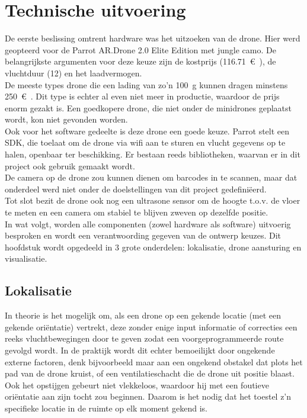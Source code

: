 \chapter{Technische uitvoering}
De eerste beslissing omtrent hardware was het uitzoeken van de drone.
Hier werd geopteerd voor de Parrot AR.Drone 2.0 Elite Edition met jungle camo.
De belangrijkste argumenten voor deze keuze zijn de kostprijs (\SI{116.71}{\euro{}}), de vluchtduur (\SI{12}{\min}) en het laadvermogen.\\
De meeste types drone die een lading van zo'n \SI{100}{\g} kunnen dragen minstens \SI{250}{\euro{}}.
Dit type is echter al even niet meer in productie, waardoor de prijs enorm gezakt is.
Een goedkopere drone, die niet onder de minidrones geplaatst wordt, kon niet gevonden worden.\\
Ook voor het software gedeelte is deze drone een goede keuze. Parrot stelt een SDK, die toelaat om de drone via wifi aan te sturen en vlucht gegevens op te halen, openbaar ter beschikking.
Er bestaan reeds bibliotheken, waarvan er in dit project ook gebruik gemaakt wordt.\\
De camera op de drone zou kunnen dienen om barcodes in te scannen, maar dat onderdeel werd niet onder de doelstellingen van dit project gedefini\"eerd.\\
Tot slot bezit de drone ook nog een ultrasone sensor om de hoogte t.o.v. de vloer te meten en een camera om stabiel te blijven zweven op dezelfde positie.\\

In wat volgt, worden alle componenten (zowel hardware als software) uitvoerig besproken en wordt een verantwoording gegeven van de ontwerp keuzes. Dit hoofdstuk wordt opgedeeld in 3 grote onderdelen: lokalisatie, drone aansturing en visualisatie.

\section{Lokalisatie}
In theorie is het mogelijk om, als een drone op een gekende locatie (met een gekende ori\"entatie) vertrekt, deze zonder enige input informatie of correcties een reeks vluchtbewegingen door te geven zodat een voorgeprogrammeerde route gevolgd wordt. In de praktijk wordt dit echter bemoeilijkt door ongekende externe factoren, denk bijvoorbeeld maar aan een ongekend obstakel dat plots het pad van de drone kruist, of een ventilatieschacht die de drone uit positie blaast. Ook het opstijgen gebeurt niet vlekkeloos, waardoor hij met een foutieve ori\"entatie aan zijn tocht zou beginnen. Daarom is het nodig dat het toestel z'n specifieke locatie in de ruimte op elk moment gekend is.\\

